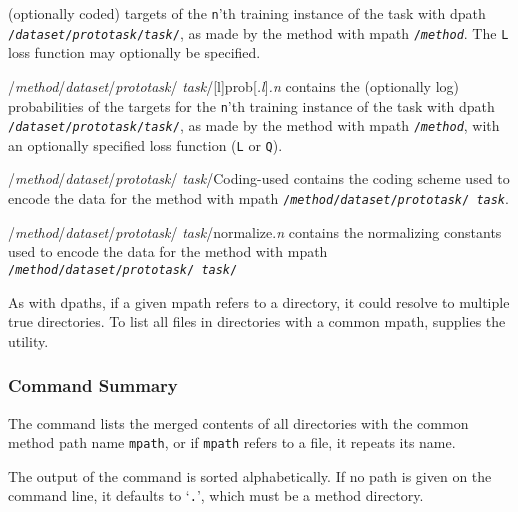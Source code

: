 \begin{ttdescription}
    (optionally coded) targets of the \texttt{n}'th training instance of
    the task with dpath
    \texttt{/{\rm\em dataset\/}/{\rm\em prototask\/}/{\rm\em task\/}/}, 
    as made by the method with mpath \texttt{/{\rm\em method}}. The
    \texttt{L} loss function may optionally be specified.
\item[/{\rm\em method\/}/{\rm\em dataset\/}/{\rm\em prototask\/}/{\rm\em 
       task\/}/{[l]}prob{[{\sl .l\/}]}{\sl .n}]
    contains the (optionally log) probabilities of the targets for the
    \texttt{n}'th training instance of the task with dpath
    \texttt{/{\rm\em dataset\/}/{\rm\em prototask\/}/{\rm\em task\/}/}, 
    as made by the method with mpath \texttt{/{\rm\em method}}, with
    an optionally specified loss function (\texttt{L} or \texttt{Q}).
\item[/{\rm\em method\/}/{\rm\em dataset\/}/{\rm\em prototask\/}/{\rm\em 
       task\/}/Coding-used]
    contains the coding scheme used to encode the data for the method with
    mpath
    \texttt{/{\rm\em method\/}/{\rm\em dataset\/}/{\rm\em prototask\/}/{\rm\em 
    task}}.
\item[/{\rm\em method\/}/{\rm\em dataset\/}/{\rm\em prototask\/}/{\rm\em 
       task\/}/normalize.{\sl n}]
    contains the normalizing constants used to encode the data for the
    method with mpath 
    \texttt{/{\rm\em method\/}/{\rm\em dataset\/}/{\rm\em prototask\/}/{\rm\em 
    task\/}/}
\end{ttdescription}

%
%


As with dpaths, if a given mpath refers to a directory, it could
resolve to multiple true directories.  To list all files in
directories with a common mpath, \delve{} supplies the \mls{} utility.

\subsubsection*{Command Summary}

The \mls{} command lists the merged contents of all directories with
the common method path name \texttt{mpath}, or if \texttt{mpath}
refers to a file, it repeats its name.

The output of the command is sorted alphabetically.  If no path is
given on the command line, it defaults to `\texttt{.}', which must be
a \delve{} method directory.

